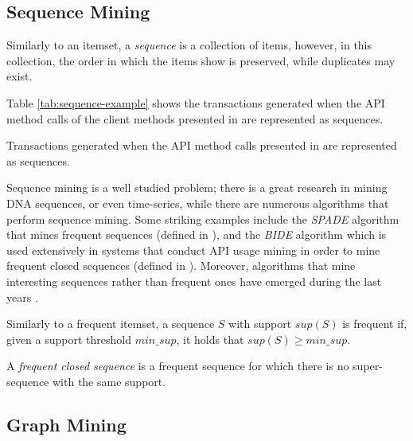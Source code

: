 \subsection{Sequence Mining}
\label{subsec:sequence-mining}

Similarly to an itemset, a \textit{sequence} is a collection of items, however, in this collection, the order in which the items show is preserved, while duplicates may exist.

Table \ref{tab:sequence-example} shows the transactions generated when the API method calls of the client methods presented in  are represented as sequences.

\begin{table}[ht]
\centering
\small
\caption[Representing the API method calls as a sequence]{Transactions generated when the API method calls presented in  are represented as sequences.}
\label{tab:sequence-example}

\end{table}

Sequence mining is a well studied problem; there is a great research in mining DNA sequences, or even time-series, while there are numerous algorithms that perform sequence mining. Some striking examples include the \textit{SPADE} algorithm \cite{Zaki:2001} that mines frequent sequences (defined in ), and the \textit{BIDE} algorithm \cite{Wang:2004} which is used extensively in systems that conduct API usage mining in order to mine frequent closed sequences (defined in ). Moreover, algorithms that mine interesting sequences rather than frequent ones have emerged during the last years \cite{Fowkes:2016}.

\begin{defn}
\label{def:freq-sequence}
Similarly to a frequent itemset, a sequence $S$ with support $sup(S)$ is frequent if, given a support threshold $min\_sup$, it holds that $sup(S)\geq min\_sup$.
\end{defn}

\begin{defn}
\label{def:freq-closed-sequence}
A \textit{frequent closed sequence} is a frequent sequence for which there is no super-sequence with the same support.
\end{defn}


\subsection{Graph Mining}
\label{subsec:graph-mining}

